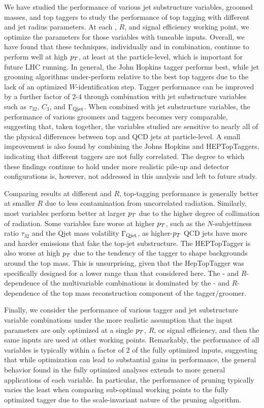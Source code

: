 We have studied the performance of various jet substructure variables, groomed masses, and top taggers to study the performance of top tagging with different \pt and jet radius parameters. At each \pt, $R$, and signal efficiency working point, we optimize the parameters for those variables with tuneable inputs. Overall, we have found that these techniques, individually and in combination, continue to perform well at high $p_T$, at least at the particle-level, which is important for future LHC running. In general, the John Hopkins tagger performs best, while jet grooming algorithms under-perform relative to the best top taggers due to the lack of an optimized $W$-identification step. 
Tagger performance can be improved by a further factor of 2-4 through combination with jet substructure variables such as $\tau_{32}$, $C_3$, and $\Gamma_{\rm Qjet}$. When combined with jet substructure variables, the performance of various groomers and taggers becomes very comparable, suggesting that, taken together, the variables studied are sensitive to nearly all of the physical differences between top and QCD jets at particle-level. A small improvement is also found by combining the Johns Hopkins and HEPTopTaggers, indicating that different taggers are not fully correlated. The degree to which these findings continue to hold under more realistic pile-up and detector configurations is, however, not addressed in this analysis and left to future study.

Comparing results at different \pt and $R$, top-tagging performance is generally better at smaller $R$ due to less contamination from uncorrelated radiation. Similarly, most variables perform better at larger $p_T$ due to the higher degree of collimation of radiation. Some variables fare worse at higher $p_T$, such as the $N$-subjettiness ratio $\tau_{32}$ and the Qjet mass volatility $\Gamma_{\rm Qjet}$, as higher-$p_T$ QCD jets have more and harder emissions that fake the top-jet substructure. The HEPTopTagger is also worse at high $p_T$ due to the tendency of the tagger to shape backgrounds around the top mass. This is unsurprising, given that the HepTopTagger was specifically designed for a lower \pT range than that considered here. The \pt- and $R$-dependence of the multivariable combinations is dominated by the \pt- and $R$-dependence of the top mass reconstruction component of the tagger/groomer.

Finally, we consider the performance of various tagger and jet substructure variable combinations under the more realistic assumption that the input parameters are only optimized at a single $p_T$, $R$, or signal efficiency, and then the same inputs are used at other working points. Remarkably, the performance of all variables is typically within a factor of 2 of the fully optimized inputs, suggesting that while optimization can lead to substantial gains in performance, the general behavior found in the fully optimized analyses extends to more general applications of each variable. In particular, the performance of pruning typically varies the least when comparing sub-optimal working points to the fully optimized tagger due to the scale-invariant nature of the pruning algorithm.
